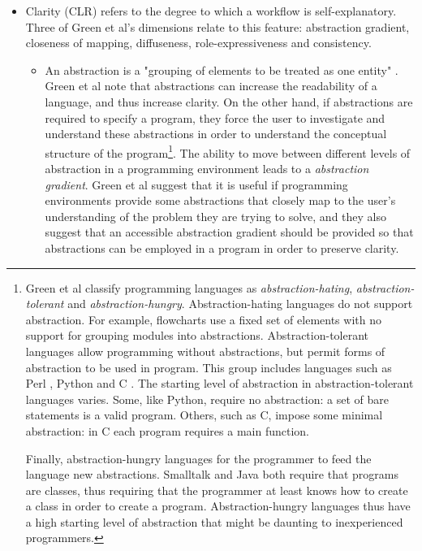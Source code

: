 \documentclass[a4paper,10pt]{scrreprt}
\begin{document}
\begin{itemize}
\item Clarity (CLR) refers to the degree to which a \gls{workflow} is self-explanatory. Three of Green et al's dimensions relate to this feature: abstraction gradient, closeness of mapping, diffuseness, role-expressiveness and consistency.
\begin{itemize}
\item An abstraction is a "grouping of elements to be treated as one entity" \cite{green_usability_1996}. Green et al note that abstractions can increase the readability of a language, and thus increase clarity. On the other hand, if abstractions are required to specify a program, they force the user to investigate and understand these abstractions in order to understand the conceptual structure of the program\footnote{Green et al classify programming languages as \emph{abstraction-hating}, \emph{abstraction-tolerant} and \emph{abstraction-hungry}. Abstraction-hating languages do not support abstraction. For example, flowcharts use a fixed set of elements with no support for grouping modules into abstractions. Abstraction-tolerant languages allow programming without abstractions, but permit forms of abstraction to be used in program. This group includes languages such as Perl \cite{christiansen_programming_2012}, Python \cite{python_software_foundation_python_2012} and C \cite{iso_jtc_1/sc_22_c_2011}. The 
starting level of abstraction in abstraction-tolerant languages varies. Some, like Python, require no abstraction: a set of bare statements is a valid program. Others, such as C, impose some minimal abstraction: in C each program requires a main function. 

Finally, abstraction-hungry languages for the programmer to feed the language new abstractions. Smalltalk \cite{goldberg_smalltalk-80:_1983} and Java \cite{oracle_jsr_2011} both require that programs are classes, thus requiring that the programmer at least knows how to create a class in order to create a program. Abstraction-hungry languages thus have a high starting level of abstraction that might be daunting to inexperienced programmers.}. The ability to move between different levels of abstraction in a programming environment leads to a \emph{abstraction gradient}. Green et al suggest that it is useful if programming environments provide some abstractions that closely map to the user's understanding of the problem they are trying to solve, and they also suggest that an accessible abstraction gradient should be provided so that abstractions can be employed in a program in order to preserve clarity.


\end{itemize}
\end{itemize}
\end{document}
